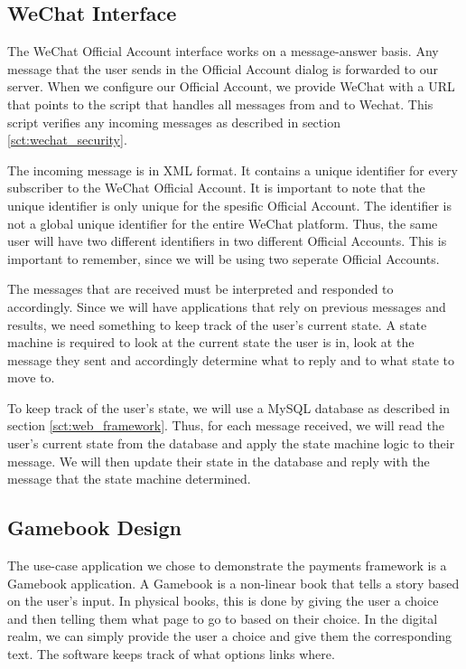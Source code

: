 \subsection{WeChat Interface}

The WeChat Official Account interface works on a message-answer basis. Any message that the user sends in the Official Account dialog is forwarded to our server. When we configure our Official Account, we provide WeChat with a URL that points to the script that handles all messages from and to Wechat. This script verifies any incoming messages as described in section \ref{sct:wechat_security}.

The incoming message is in XML format. It contains a unique identifier for every subscriber to the WeChat Official Account. It is important to note that the unique identifier is only unique for the spesific Official Account. The identifier is not a global unique identifier for the entire WeChat platform. Thus, the same user will have two different identifiers in two different Official Accounts. This is important to remember, since we will be using two seperate Official Accounts.

The messages that are received must be interpreted and responded to accordingly. Since we will have applications that rely on previous messages and results, we need something to keep track of the user's current state. A state machine is required to look at the current state the user is in, look at the message they sent and accordingly determine what to reply and to what state to move to. 

To keep track of the user's state, we will use a MySQL database as described in section \ref{sct:web_framework}. Thus, for each message received, we will read the user's current state from the database and apply the state machine logic to their message. We will then update their state in the database and reply with the message that the state machine determined.

\subsection{Gamebook Design}
\label{sct:gamebook_design}

The use-case application we chose to demonstrate the payments framework is a Gamebook application. A Gamebook is a non-linear book that tells a story based on the user's input. In physical books, this is done by giving the user a choice and then telling them what page to go to based on their choice. In the digital realm, we can simply provide the user a choice and give them the corresponding text. The software keeps track of what options links where.

